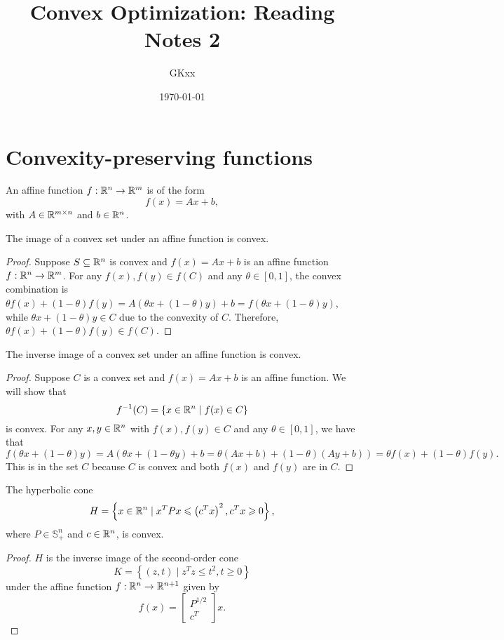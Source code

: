 \documentclass[12pt]{article}
\title{Convex Optimization: Reading Notes 2}
\author{GKxx}
\date{\today}
\begin{document}
\maketitle

\section{Convexity-preserving functions}

\begin{definition}
    An \textnormal{affine function} \(f:\mathbb R^n\to\mathbb R^m\) is of the form
    \[f(x)=Ax+b,\]
    with \(A\in\mathbb R^{m\times n}\) and \(b\in\mathbb R^n\).
\end{definition}

\begin{proposition}
    The image of a convex set under an affine function is convex.
\end{proposition}
\begin{proof}
    Suppose \(S\subseteq\mathbb R^n\) is convex and \(f(x)=Ax+b\) is an affine function \(f:\mathbb R^n\to\mathbb R^m\). For any \(f(x), f(y)\in f(C)\) and any \(\theta\in[0,1]\), the convex combination is \(\theta f(x)+(1-\theta)f(y)=A(\theta x+(1-\theta)y)+b=f(\theta x+(1-\theta)y)\), while \(\theta x+(1-\theta)y\in C\) due to the convexity of \(C\). Therefore, \(\theta f(x)+(1-\theta)f(y)\in f(C)\).
\end{proof}

\begin{proposition}
    The inverse image of a convex set under an affine function is convex.
\end{proposition}
\begin{proof}
    Suppose \(C\) is a convex set and \(f(x)=Ax+b\) is an affine function. We will show that
    \[f^{-1}(C)=\left\{x\in\mathbb R^n\mid f(x)\in C\right\}\]
    is convex. For any \(x,y\in\mathbb R^n\) with \(f(x),f(y)\in C\) and any \(\theta\in[0,1]\), we have that
    \[f(\theta x+(1-\theta)y)=A(\theta x+(1-\theta y)+b=\theta(Ax+b)+(1-\theta)(Ay+b))=\theta f(x)+(1-\theta) f(y).\]
    This is in the set \(C\) because \(C\) is convex and both \(f(x)\) and \(f(y)\) are in \(C\).
\end{proof}

\begin{example}
    The hyperbolic cone
    \[H=\left\{x\in\mathbb R^n\mid x^TPx\leqslant\left(c^Tx\right)^2,c^Tx\geqslant 0\right\},\]
    where \(P\in\mathbb S_+^n\) and \(c\in\mathbb R^n\), is convex.
\end{example}
\begin{proof}
    \(H\) is the inverse image of the second-order cone
    \[K=\left\{(z,t)\mid z^Tz\leqslant t^2,t\geqslant 0\right\}\]
    under the affine function \(f:\mathbb R^n\to\mathbb R^{n+1}\) given by
    \[f(x)=\begin{bmatrix}
        P^{1/2}\\ c^T
    \end{bmatrix}x.\]
\end{proof}
\end{document}
